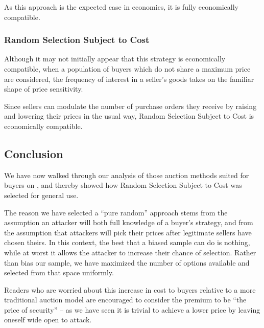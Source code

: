 As this approach is the expected case in economics, it is fully
economically compatible.

\subsubsection{Random Selection Subject to Cost}

Although it may not initially appear that this strategy is
economically compatible, when a population of buyers which do not
share a maximum price are considered, the frequency of interest in a
seller's goods takes on the familiar shape of price sensitivity.


Since sellers can modulate the number of purchase orders they receive
by raising and lowering their prices in the usual way, Random
Selection Subject to Cost is economically compatible.

\subsection{Conclusion}

We have now walked through our analysis of those auction methods
suited for buyers on \tOM{}, and thereby showed how Random Selection
Subject to Cost was selected for general use.

The reason we have selected a ``pure random'' approach stems from the
assumption an attacker will both full knowledge of a buyer's strategy,
and from the assumption that attackers will pick their prices after
legitimate sellers have chosen theirs.  In this context, the best that
a biased sample can do is nothing, while at worst it allows the
attacker to increase their chance of selection. Rather than bias our
sample, we have maximized the number of options available and selected
from that space uniformly.

Readers who are worried about this increase in cost to buyers relative
to a more traditional auction model are encouraged to consider the
premium to be ``the price of security'' -- as we have seen it is
trivial to achieve a lower price by leaving oneself wide open to
attack.
